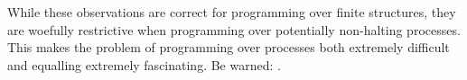 While these observations are correct for programming over finite 
structures, they are woefully restrictive when programming over 
potentially non-halting processes. This makes the problem of programming 
over processes both extremely difficult and equalling extremely 
fascinating. Be warned: .

